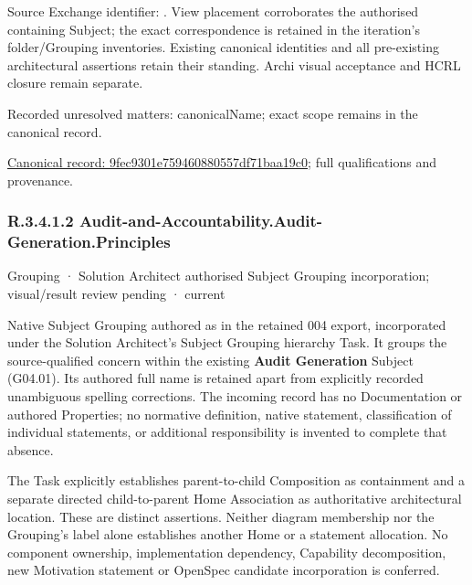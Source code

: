 Source Exchange identifier: \texttt{}. View placement corroborates
the authorised containing Subject; the exact correspondence is retained in the
iteration's folder/Grouping inventories. Existing canonical identities and all
pre-existing architectural assertions retain their standing. Archi visual
acceptance and HCRL closure remain separate.


{\small Recorded unresolved matters: canonicalName; exact scope remains in the canonical record.}\par
{\footnotesize \href{../../../../continuum/grouping/9fec9301e759460880557df71baa19c0.md}{Canonical record: 9fec9301e759460880557df71baa19c0}; full qualifications and provenance.}\par
\subsubsection*{R.3.4.1.2 Audit-and-Accountability.Audit-Generation.Principles}
\label{navigation:R.3.4.1.2}

\label{element:d56a556f29ff4ba78634e58d103c786e}
{\small Grouping · Solution Architect authorised Subject Grouping incorporation; visual/result review pending · current}\par

Native Subject Grouping authored as \texttt{} in the retained 004 export,
incorporated under the Solution Architect's Subject Grouping hierarchy Task.
It groups the source-qualified \texttt{} concern within
the existing \textbf{Audit Generation} Subject (G04.01). Its authored full name
is retained apart from explicitly recorded unambiguous spelling corrections.
The incoming record has no Documentation or authored Properties; no normative
definition, native statement, classification of individual statements, or
additional responsibility is invented to complete that absence.



The Task explicitly establishes parent-to-child Composition as containment and
a separate directed child-to-parent Home Association as authoritative architectural
location. These are distinct assertions. Neither diagram membership nor the
Grouping's label alone establishes another Home or a statement allocation.
No component ownership, implementation dependency, Capability decomposition,
new Motivation statement or OpenSpec candidate incorporation is conferred.



